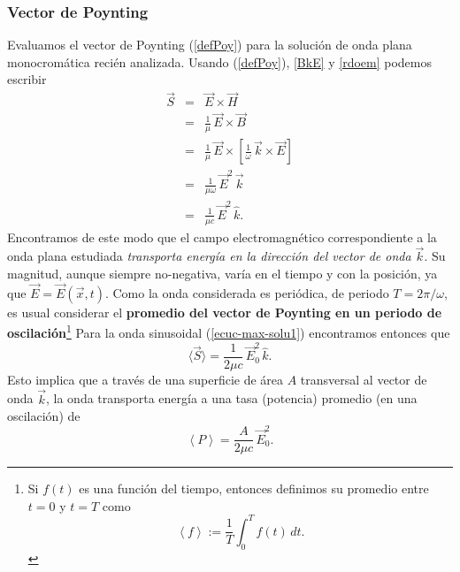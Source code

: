 \subsubsection{Vector de Poynting}
Evaluamos el vector de Poynting (\ref{defPoy}) para la solución de onda plana monocromática recién analizada. Usando (\ref{defPoy}), \eqref{BkE} y \eqref{rdoem} podemos escribir
\begin{eqnarray}
 \vec{S}&=&\vec{E}\times\vec{H} \\
&=&\frac{1}{\mu}\,\vec{E}\times\vec{B} \\
&=&\frac{1}{\mu}\,\vec{E}\times\left[\frac{1}{\omega}\,\vec{k}\times\vec{E}
\right] \\
&=&\frac{1}{\mu\omega}\,\vec{E}^2\,\vec{k}\\
&=&\frac{1}{\mu c}\,\vec{E}^2\,\hat{k}. \label{Sop}
\end{eqnarray}
Encontramos de este modo que el campo electromagnético correspondiente a la onda plana estudiada \textit{transporta energía en la dirección del vector de onda $\vec{k}$}. Su magnitud, aunque siempre no-negativa, varía en el tiempo y con la posición, ya que $\vec{E}=\vec{E}(\vec{x},t)$. Como la onda considerada es periódica, de periodo $T=2\pi/\omega$, es usual considerar el \textbf{promedio del vector de Poynting en un periodo de oscilación}\footnote{Si $f(t)$ es una función del tiempo, entonces definimos su promedio entre $t=0$ y $t=T$ como 
\begin{equation}
\left<f\right>:=\frac{1}{T}\int_0^Tf(t)\,dt.
\end{equation}}
Para la onda sinusoidal (\ref{ecuc-max-solu1}) encontramos entonces que
\begin{equation}\label{Sprom}
\langle\vec{S}\rangle=\frac{1}{2\mu c}\,\vec{E}_0^2\,\hat{k}.
\end{equation}
Esto implica que a través de una superficie de área $A$ transversal al vector de onda $\vec{k}$, la onda transporta energía a una tasa (potencia) promedio (en una oscilación) de 
\begin{equation}
 \left<P\right>=\frac{A}{2\mu c}\,\vec{E}_0^2.
\end{equation}

